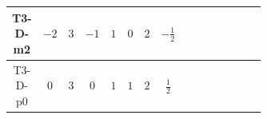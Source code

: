 \documentclass[8pt]{article}
\begin{document}
\begin{landscape}
\begin{longtable}{@{}cccccccc >{\raggedright\arraybackslash}p{0.21\linewidth} >{\raggedright\arraybackslash}p{0.21\linewidth} >{\raggedright\arraybackslash}p{0.21\linewidth}@{}}
\midrule
T3-D-m2 & $-2$ & $3$ & $-1$ & $1$ & $0$ & $2$ & $-\frac{1}{2}$ & \scriptsize\adjustbox{max width=\linewidth}{$\begin{gathered} -2 \hbar  \log \left(\frac{\bar{\mu}^{2}}{M_F^2}\right) \overline{y_{2,i_1,r_1}} \overline{y_{2,i_2,r_2}} S_2^2 y_{2,i_1,r_2} y_{2,i_2,r_1} \left(S_2{}^{\dagger }\right){}^2 \\ +2 C_{S_2^\dagger S_2} \hbar  \log \left(\frac{\bar{\mu}^{2}}{M_F^2}\right) \overline{y_{2,i_1,r_1}} S_2 y_{2,i_1,r_1} S_2{}^{\dagger } \\ -2 \hbar  \log \left(\frac{\bar{\mu}^{2}}{M_F^2}\right) \overline{y_{2,i_1,r_1}} S_2^2 y_{2,i_1,r_1} \left(S_2{}^{\dagger }\right){}^2 \lambda_{S_2}^{(1)}^{(1)}\end{gathered}$} &  & \scriptsize\adjustbox{max width=\linewidth}{$\begin{gathered} -\frac{1}{2} \hbar  \log \left(\frac{\bar{\mu}^{2}}{M_F^2}\right) B_{\mu _1\mu _2}^2\end{gathered}$} \\
\midrule
T3-D-p0 & $0$ & $3$ & $0$ & $1$ & $1$ & $2$ & $\frac{1}{2}$ & \scriptsize\adjustbox{max width=\linewidth}{$\begin{gathered} -2 \hbar  \log \left(\frac{\bar{\mu}^{2}}{M_F^2}\right) \overline{y_{2,i_1,r_1}} \overline{y_{2,i_2,r_2}} S_2^2 y_{2,i_1,r_2} y_{2,i_2,r_1} \left(S_2{}^{\dagger }\right){}^2 \\ +2 C_{S_2^\dagger S_2} \hbar  \log \left(\frac{\bar{\mu}^{2}}{M_F^2}\right) \overline{y_{2,i_1,r_1}} S_2 y_{2,i_1,r_1} S_2{}^{\dagger } \\ -2 \hbar  \log \left(\frac{\bar{\mu}^{2}}{M_F^2}\right) \overline{y_{2,i_1,r_1}} S_2^2 y_{2,i_1,r_1} \left(S_2{}^{\dagger }\right){}^2 \lambda_{S_2}^{(1)}^{(1)}\end{gathered}$} &  & \scriptsize\adjustbox{max width=\linewidth}{$\begin{gathered} -\frac{1}{2} \hbar  \log \left(\frac{\bar{\mu}^{2}}{M_F^2}\right) B_{\mu _1\mu _2}^2\end{gathered}$} \\
\midrule

\end{longtable}
\end{landscape}
\end{document}
